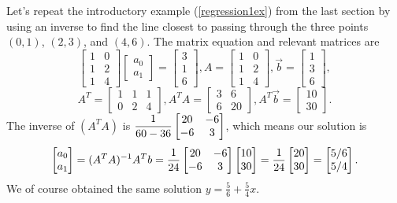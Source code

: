 \begin{example}
Let's repeat the introductory example (\ref{regression1ex}) from the last section by using an inverse to find the line closest to passing through the three points $(0,1)$, $(2,3)$, and $(4,6)$. The matrix equation and relevant matrices are
$$\begin{bmatrix}1&0\\1&2\\1&4\end{bmatrix}
\begin{bmatrix}a_0\\a_1\end{bmatrix}
=\begin{bmatrix}3\\1\\6\end{bmatrix},
A = \begin{bmatrix}1&0\\1&2\\1&4\end{bmatrix},
\vec b = \begin{bmatrix}1\\3\\6\end{bmatrix}, $$$$
A^T= \begin{bmatrix}1&1&1\\0&2&4\end{bmatrix}, 
A^T A= \begin{bmatrix}3&6\\6&20\end{bmatrix}, 
A^T\vec b = \begin{bmatrix}10\\30\end{bmatrix}.
$$
The inverse of $(A^TA)$ is $\displaystyle\frac{1}{60-36}\begin{bmatrix}20&-6\\-6&3\end{bmatrix}$, which means our solution is 
$$
\begin{bmatrix}a_0\\a_1\end{bmatrix} 
= (A^TA)^{-1}A^T b 
= \displaystyle\frac{1}{24}\begin{bmatrix}20&-6\\-6&3\end{bmatrix}\begin{bmatrix}10\\30\end{bmatrix}
= \displaystyle\frac{1}{24}\begin{bmatrix}20\\30\end{bmatrix}  
= \begin{bmatrix}5/6\\5/4\end{bmatrix}. 
$$
We of course obtained the same solution $y=\frac{5}{6}+\frac{5}{4}x$.
\end{example}


